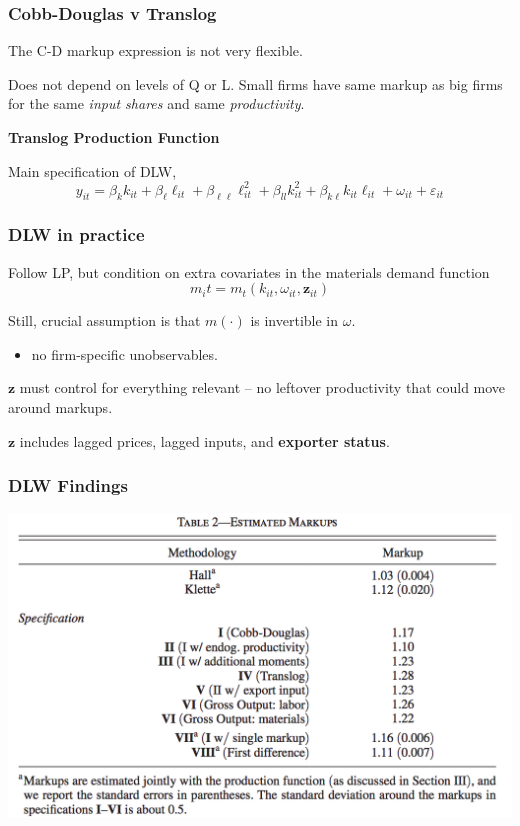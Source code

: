 \documentclass[11pt, aspectratio=169]{beamer}
\newenvironment{wideitemize}{\itemize\addtolength{\itemsep}{10pt}}{\enditemize}
\begin{document}
\begin{frame}[c]\frametitle{Cobb-Douglas v Translog}
    
\begin{wideitemize}
	\item The C-D markup expression is not very flexible. 
	\item Does not depend on levels of Q or L. Small firms have same markup as big firms for the same \emph{input shares} and same \emph{productivity}.
\end{wideitemize}
		
\bigskip
\textbf{Translog Production Function}
\begin{wideitemize}
			\item Main specification of DLW,
	$$ y_{it} = \beta_k k_{it} + \beta_{\ell} \ell_{it} + \beta_{\ell\ell} \ell^2_{it} + \beta_{ll} k^2_{it} + \beta_{k\ell}k_{it}\ell_{it} + \omega_{it} + \varepsilon_{it} $$
\end{wideitemize}

\end{frame}


\begin{frame}[c]\frametitle{DLW in practice}

\begin{wideitemize}
	\item Follow LP, but condition on extra covariates in the materials demand function
	$$m_it = m_t(k_{it},\omega_{it},\mathbf{z}_{it})$$
	\item Still, crucial assumption is that $m(\cdot)$ is invertible in $\omega$. 
	\begin{itemize}
		\item no firm-specific unobservables.
	\end{itemize}
	\item $\mathbf{z}$ must control for everything relevant -- no leftover productivity that could move around markups.
	\item $\mathbf{z}$ includes lagged prices, lagged inputs, and \textbf{exporter status}.
\end{wideitemize}

\end{frame}


\begin{frame}[c]\frametitle{DLW Findings}
    
\centering
\includegraphics[scale=.35]{DLW-Table2.png}

\end{frame}
\end{document}
